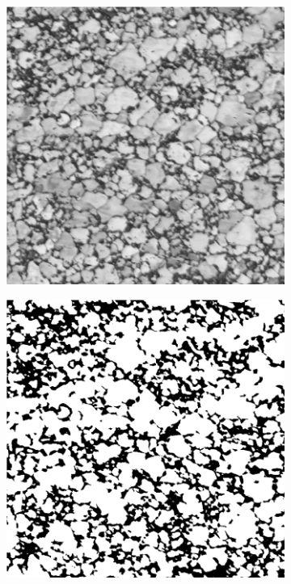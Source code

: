 \documentclass{article}
\begin{document}
\begin{figure}[h!]
     \centering
     \begin{subfigure}[b]{0.3\textwidth}
         \centering
         \includegraphics[width=\textwidth]{Micro1_800.png}
         \caption{}
         \label{fig:Micro1_800}
     \end{subfigure}
     \hfill
     \begin{subfigure}[b]{0.3\textwidth}
         \centering
         \includegraphics[width=\textwidth]{Micro2_800.png}

\end{subfigure}
\end{figure}
\end{document}

